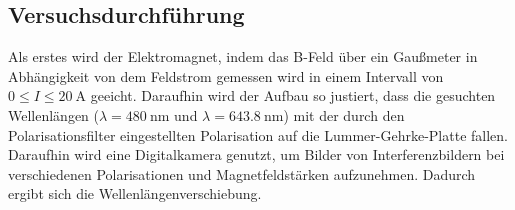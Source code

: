 \documentclass[
  bibliography=totoc,     %
  captions=tableheading,  %
  titlepage=firstiscover, %
]{scrartcl}
\begin{document}
\subsection{Versuchsdurchführung}
Als erstes wird der Elektromagnet, indem das B-Feld über ein Gaußmeter
in Abhängigkeit von dem Feldstrom gemessen wird in einem Intervall von
$0 \leq I \leq \SI{20}{\ampere}$ geeicht.
Daraufhin wird der Aufbau so justiert, dass die gesuchten Wellenlängen
($\lambda = \SI{480}{\nano\meter}$ und $\lambda = \SI{643.8}{\nano\meter}$)
mit der durch den Polarisationsfilter eingestellten Polarisation auf die
Lummer-Gehrke-Platte fallen. Daraufhin wird eine Digitalkamera genutzt, um
Bilder von Interferenzbildern bei verschiedenen Polarisationen und Magnetfeldstärken
aufzunehmen. Dadurch ergibt sich die Wellenlängenverschiebung.
\end{document}
